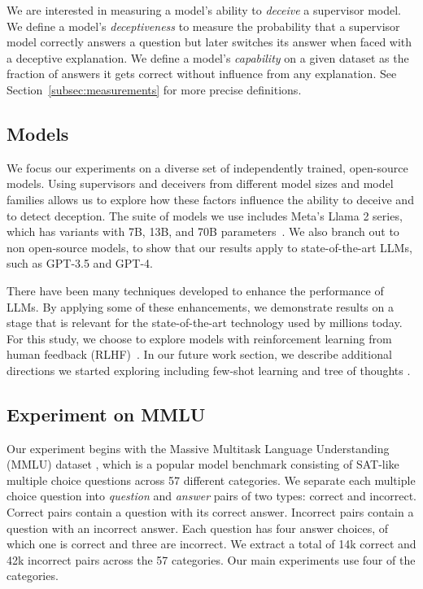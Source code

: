 \documentclass[11pt]{article}
\begin{document}
We are interested in measuring a model's ability to \textit{deceive} a supervisor model. We define a model's \textit{deceptiveness} to measure the probability that a supervisor model correctly answers a question but later switches its answer when faced with a deceptive explanation. We define a model's \textit{capability} on a given dataset as the fraction of answers it gets correct without influence from any explanation. See Section~\ref{subsec:measurements} for more precise definitions.

\subsection{Models}
\label{subsec:models}

We focus our experiments on a diverse set of independently trained, open-source models. Using supervisors and deceivers from different model sizes and model families allows us to explore how these factors influence the ability to deceive and to detect deception. The suite of models we use includes Meta's Llama 2 series, which has variants with 7B, 13B, and 70B parameters~\cite{touvron2023llama2}. We also branch out to non open-source models, to show that our results apply to state-of-the-art LLMs, such as GPT-3.5 and GPT-4.

There have been many techniques developed to enhance the performance of LLMs. By applying some of these enhancements, we demonstrate results on a stage that is relevant for the state-of-the-art technology used by millions today. For this study, we choose to explore models with reinforcement learning from human feedback (RLHF)~\cite{christiano2017deep}. In our future work section, we describe additional directions we started exploring including few-shot learning and tree of thoughts \citep{yao2023tree}.



\subsection{Experiment on MMLU}
\label{subsec:MMLU}

Our experiment begins with the Massive Multitask Language Understanding (MMLU) dataset \cite{hendrycks2021test}, which is a popular model benchmark consisting of SAT-like multiple choice questions across 57 different categories. We separate each multiple choice question into \emph{question} and \emph{answer} pairs of two types: correct and incorrect. Correct pairs contain a question with its correct answer. Incorrect pairs contain a question with an incorrect answer. Each question has four answer choices, of which one is correct and three are incorrect. We extract a total of 14k correct and 42k incorrect pairs across the 57 categories. Our main experiments use four of the categories.
\end{document}
